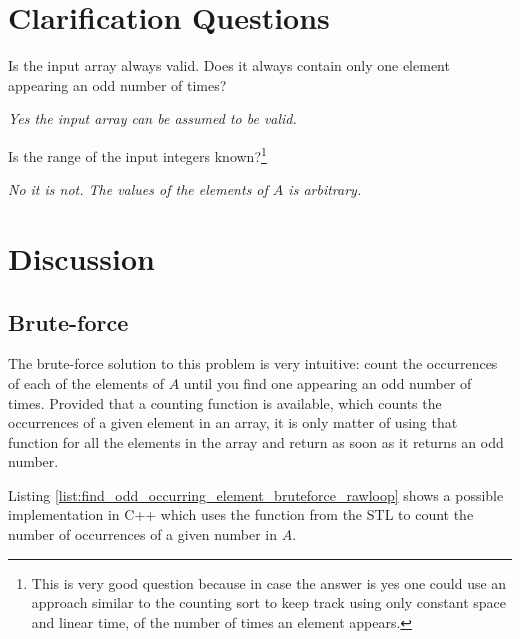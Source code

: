 \section{Clarification Questions}

\begin{QandA}
	\item Is the input array always valid. Does it always contain only one element appearing an odd number of times?
	\begin{answered}
		\textit{Yes the input array can be assumed to be valid.}
	\end{answered}
	\item  Is the range of the input integers known?\footnote{This is very good question because in case the answer is yes one could use an approach similar to the counting sort to keep track using only constant space and linear time, of the number of times an element appears.}
	\begin{answered}
		\textit{No it is not. The values of the elements of $A$ is arbitrary.}
	\end{answered}
	
\end{QandA}

\section{Discussion}

\subsection{Brute-force}
\label{find_odd_occurring_element:sec:bruteforce}
The brute-force solution to this problem is very intuitive: count the occurrences of each of the elements of $A$ until you find one appearing an odd number of times.  
Provided that a counting function is available, which counts the occurrences of a given element in an array, it is only matter of using that function for all the elements in the array and return as soon as it returns an odd number. 

Listing \ref{list:find_odd_occurring_element_bruteforce_rawloop} shows a possible implementation in C++ which uses the  function from the STL to count the number of occurrences of a given number in $A$.



